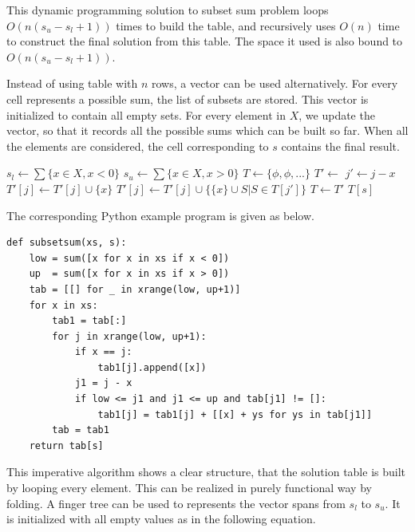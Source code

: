 \documentclass[UTF8]{article}
\begin{document}
This dynamic programming solution to subset sum problem loops $O(n(s_u - s_l + 1))$ times
to build the table, and recursively uses $O(n)$ time to construct the final solution from this table.
The space it used is also bound to $O(n(s_u - s_l + 1))$.

Instead of using table with $n$ rows, a vector can be used alternatively. For every cell
represents a possible sum, the list of subsets are stored. This vector is initialized to contain
all empty sets. For every element in $X$, we update the vector, so that it records all the possible
sums which can be built so far. When all the elements are considered, the cell corresponding
to $s$ contains the final result.

\begin{algorithmic}[1]
  \State $s_l \gets \sum \{x \in X, x < 0\}$
  \State $s_u \gets \sum \{x \in X, x > 0\}$
  \State $T \gets \{\phi, \phi, ...\}$ 
    \State $T' \gets$ 
      \State $j' \gets j - x$
        \State $T'[j] \gets T'[j] \cup \{x\}$
      \EndIf
        \State $T'[j] \gets T'[j] \cup \{\{x\} \cup S | S \in T[j']\}$
      \EndIf
    \EndFor
    \State $T \gets T'$
  \EndFor
  \State \Return $T[s]$
\EndFunction
\end{algorithmic}

The corresponding Python example program is given as below.

\lstset{language=Python}
\begin{lstlisting}
def subsetsum(xs, s):
    low = sum([x for x in xs if x < 0])
    up  = sum([x for x in xs if x > 0])
    tab = [[] for _ in xrange(low, up+1)]
    for x in xs:
        tab1 = tab[:]
        for j in xrange(low, up+1):
            if x == j:
                tab1[j].append([x])
            j1 = j - x
            if low <= j1 and j1 <= up and tab[j1] != []:
                tab1[j] = tab1[j] + [[x] + ys for ys in tab[j1]]
        tab = tab1
    return tab[s]
\end{lstlisting}

This imperative algorithm shows a clear structure, that the solution table is
built by looping every element. This can be realized in purely functional
way by folding. A finger tree can be used to represents the vector spans
from $s_l$ to $s_u$. It is initialized with all empty values as in the following
equation.
\end{document}
